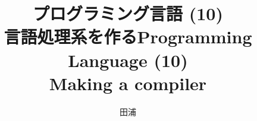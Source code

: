 \documentclass[12pt,dvipdfmx]{beamer}
\title{プログラミング言語 (10) \\ 言語処理系を作る}
\title{Programming Language (10) \\ Making a compiler}
\institute{}
\author{田浦}
\date{}
\newif\ifen
\newif\ifja
\newcommand{\ao}[1]{{\color{blue}#1}}
\begin{document}
\maketitle

\begin{frame}
\ifja
\frametitle{目次}
\fi
\ifen
\frametitle{Contents}
\fi
\tableofcontents
\end{frame}

\iffalse


\ifja
\begin{frame}
\frametitle{言語処理系実装の形態}
\begin{itemize}
\item \ao{インタプリタ:} プログラムを解釈実行(プログラムと入力から出力を直接計算)
\item \ao{トランスレータ:} プログラムを別の言語(例: C)に翻訳
  \begin{itemize}
  \item 例: OpenMP (Cの並列拡張) を C (+ Pthreads) に翻訳
  \end{itemize}
\item \ao{コンパイラ:} プログラムを機械語に翻訳
\end{itemize}
\end{frame}
\fi

\ifen
\begin{frame}
\frametitle{Various forms of language implementation}
\begin{itemize}
\item \ao{interpreter:} interprets and executes programs
  (takes a program and an input; and computes the output)
\item \ao{translator (transpiler):} translates programs into another language (e.g., C)
  \begin{itemize}
  \item e.g. translate OpenMP (parallel extension to C) to C (+ Pthreads)
  \end{itemize}
\item \ao{compiler:} translates programs into \ao{a machine (assembly) code}
\end{itemize}
\end{frame}
\fi

\iffalse
\begin{frame}
\frametitle{言語処理系実装の形態}
\begin{itemize}
\item インタプリタ: interp(プログラム, 入力) = 出力
\item トランスレータ・コンパイラ: compile(プログラム) = プログラム' ; プログラム'(入力) = 出力
\end{itemize}
\end{frame}
\fi
\end{document}
